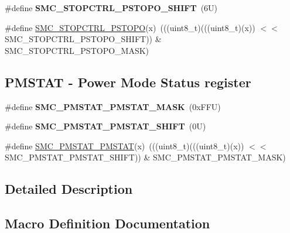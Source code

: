 \begin{DoxyCompactItemize}
\item 
\mbox{\label{group___s_m_c___register___masks_gac99e62cd86e9c12454c78fd6d5e3dc75}} 
\#define {\bfseries S\+M\+C\+\_\+\+S\+T\+O\+P\+C\+T\+R\+L\+\_\+\+P\+S\+T\+O\+P\+O\+\_\+\+S\+H\+I\+FT}~(6\+U)
\item 
\#define \mbox{\hyperlink{group___s_m_c___register___masks_gab9a92e4e28cd51019d49beff472acdc4}{S\+M\+C\+\_\+\+S\+T\+O\+P\+C\+T\+R\+L\+\_\+\+P\+S\+T\+O\+PO}}(x)~(((uint8\+\_\+t)(((uint8\+\_\+t)(x)) $<$$<$ S\+M\+C\+\_\+\+S\+T\+O\+P\+C\+T\+R\+L\+\_\+\+P\+S\+T\+O\+P\+O\+\_\+\+S\+H\+I\+FT)) \& S\+M\+C\+\_\+\+S\+T\+O\+P\+C\+T\+R\+L\+\_\+\+P\+S\+T\+O\+P\+O\+\_\+\+M\+A\+SK)
\end{DoxyCompactItemize}
\subsection*{P\+M\+S\+T\+AT -\/ Power Mode Status register}
\begin{DoxyCompactItemize}
\item 
\mbox{\label{group___s_m_c___register___masks_ga2574f973caed7a43c1d0b69888866f63}} 
\#define {\bfseries S\+M\+C\+\_\+\+P\+M\+S\+T\+A\+T\+\_\+\+P\+M\+S\+T\+A\+T\+\_\+\+M\+A\+SK}~(0x\+F\+F\+U)
\item 
\mbox{\label{group___s_m_c___register___masks_gaa4083ab43677e6a1b6832f6607a5ef0e}} 
\#define {\bfseries S\+M\+C\+\_\+\+P\+M\+S\+T\+A\+T\+\_\+\+P\+M\+S\+T\+A\+T\+\_\+\+S\+H\+I\+FT}~(0\+U)
\item 
\#define \mbox{\hyperlink{group___s_m_c___register___masks_ga27d1d3c05772950ce55e5ad4d2a998e3}{S\+M\+C\+\_\+\+P\+M\+S\+T\+A\+T\+\_\+\+P\+M\+S\+T\+AT}}(x)~(((uint8\+\_\+t)(((uint8\+\_\+t)(x)) $<$$<$ S\+M\+C\+\_\+\+P\+M\+S\+T\+A\+T\+\_\+\+P\+M\+S\+T\+A\+T\+\_\+\+S\+H\+I\+FT)) \& S\+M\+C\+\_\+\+P\+M\+S\+T\+A\+T\+\_\+\+P\+M\+S\+T\+A\+T\+\_\+\+M\+A\+SK)
\end{DoxyCompactItemize}


\subsection{Detailed Description}


\subsection{Macro Definition Documentation}
\mbox{\label{group___s_m_c___register___masks_gaa375b91daca0dd7f4b1452da903b5bdc}} 
